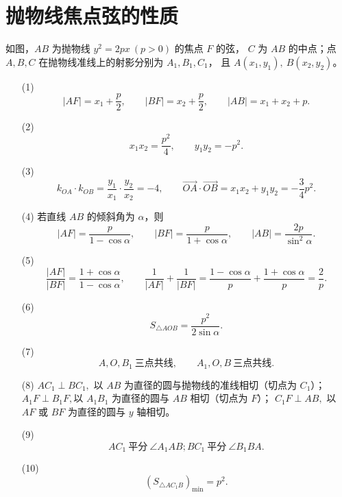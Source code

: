 \documentclass{ctexart}
\begin{document}
	

	\section*{抛物线焦点弦的性质}
	
	
	如图，$AB$ 为抛物线 $y^2=2px\ (p>0)$ 的焦点 $F$ 的弦，
	$C$ 为 $AB$ 的中点；点 $A,B,C$ 在抛物线准线上的射影分别为 $A_1,B_1,C_1$，
	且 $A(x_1,y_1),\ B(x_2,y_2)$。
	
	\medskip
	
	\begin{enumerate}
		\item[(1)] \[
		|AF|=x_1+\frac p2,\qquad |BF|=x_2+\frac p2,\qquad |AB|=x_1+x_2+p.
		\]
		
		\item[(2)] \[
		x_1x_2=\frac{p^2}{4},\qquad y_1y_2=-p^2.
		\]
		
		\item[(3)] \[
		k_{OA}\cdot k_{OB}=\frac{y_1}{x_1}\cdot\frac{y_2}{x_2}=-4,\qquad
		\overrightarrow{OA}\cdot\overrightarrow{OB}=x_1x_2+y_1y_2=-\frac34p^2.
		\]
		
		\item[(4)] 若直线 $AB$ 的倾斜角为 $\alpha$，则
		\[
		|AF|=\frac{p}{1-\cos\alpha},\qquad
		|BF|=\frac{p}{1+\cos\alpha},\qquad
		|AB|=\frac{2p}{\sin^2\alpha}.
		\]
		
		\item[(5)] \[
		\frac{|AF|}{|BF|}=\frac{1+\cos\alpha}{1-\cos\alpha},\qquad
		\frac1{|AF|}+\frac1{|BF|}
		=\frac{1-\cos\alpha}{p}+\frac{1+\cos\alpha}{p}
		=\frac{2}{p}.
		\]
		
		\item[(6)] \[
		S_{\triangle AOB}=\frac{p^2}{2\sin\alpha}.
		\]
		
		\item[(7)] \[
		A,O,B_1\ \text{三点共线},\qquad A_1,O,B\ \text{三点共线}.
		\]
		
		\item[(8)] \( AC_1\perp BC_1,\)
		以 $AB$ 为直径的圆与抛物线的准线相切（切点为 $C_1$）；
		\( 	A_1F\perp B_1F,\)以 $A_1B_1$ 为直径的圆与 $AB$ 相切（切点为 $F$）；
		\( C_1F\perp AB, \)
		以 $AF$ 或 $BF$ 为直径的圆与 $y$ 轴相切。
		
		\item[(9)] \[
		AC_1\ \text{平分}\ \angle A_1AB; BC_1\ \text{平分}\ \angle B_1BA.
		\]
		
		\item[(10)] \[
		\left(S_{\triangle AC_1B}\right)_{\min}=p^2.
		\]
	\end{enumerate}
	
\end{document}
